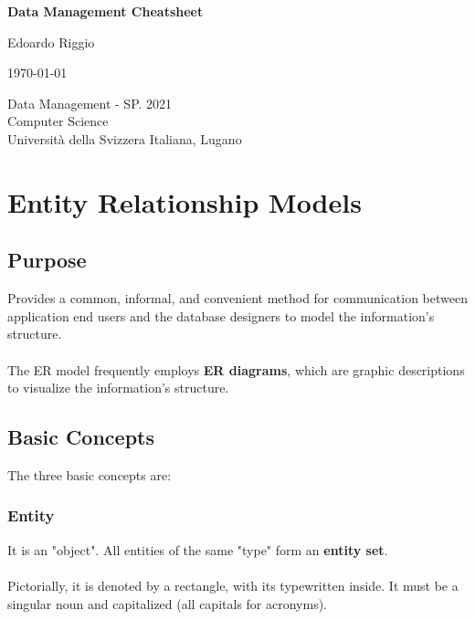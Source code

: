 \documentclass{article}
\begin{document}
\begin{titlepage}
    \begin{center}
        \vspace*{1cm}
        
        \Huge
        \textbf{Data Management Cheatsheet}
        
        \vspace{0.5cm}
        \LARGE
        
        \vspace{.5cm}
        
        Edoardo Riggio
   		  \vspace{1.5cm}
       
        \vfill
        
        \today
        
        \vspace{.8cm}
          \Large
          Data Management - SP. 2021 \\
        Computer Science\\
        Universit\`{a} della Svizzera Italiana, Lugano\\
        
    \end{center}
\end{titlepage}

\tableofcontents

\newpage

\section{Entity Relationship Models}
\subsection{Purpose}
Provides a common, informal, and convenient method for communication between application end users and the database designers to model the information's structure. \\ \\
The ER model frequently employs \textbf{ER diagrams}, which are graphic descriptions to visualize the information's structure.

\subsection{Basic Concepts}
The three basic concepts are:
\subsubsection{Entity}
It is an "object". All entities of the same "type" form an \textbf{entity set}. \\ \\
Pictorially, it is denoted by a rectangle, with its typewritten inside. It must be a singular noun and capitalized (all capitals for acronyms). \\ \\
\end{document}
